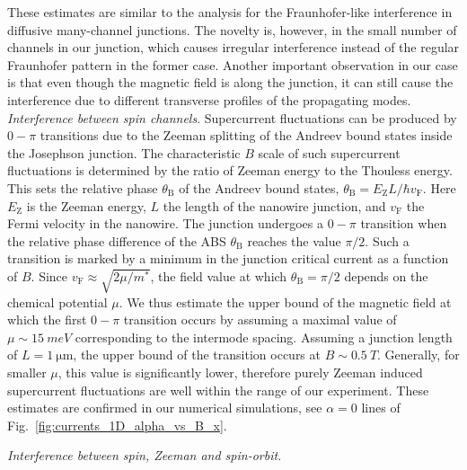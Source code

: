 These estimates are similar to the analysis for the Fraunhofer-like interference in diffusive many-channel junctions\cite{Cuevas2007}.
The novelty is, however, in the small number of channels in our junction, which causes irregular interference instead of the regular Fraunhofer pattern in the former case.
Another important observation in our case is that even though the magnetic field is along the junction, it can still cause the interference due to different transverse profiles of the propagating modes.\\

\textit{Interference between spin channels}.
Supercurrent fluctuations can be produced by $0-\pi$ transitions due to the Zeeman splitting of the Andreev bound states inside the Josephson junction.
The characteristic $B$ scale of such supercurrent fluctuations is determined by the ratio of Zeeman energy to the Thouless energy.
This sets the relative phase $\theta_\mathrm{B}$ of the Andreev bound states, $\theta_\mathrm{B} = E_\mathrm{Z} L / \hbar v_\mathrm{F}$.
Here $E_\mathrm{Z}$ is the Zeeman energy, $L$ the length of the nanowire junction, and $v_\mathrm{F}$ the Fermi velocity in the nanowire.
The junction undergoes a $0-\pi$ transition when the relative phase difference of the ABS $\theta_\mathrm{B}$ reaches the value $\pi/2$.
Such a transition is marked by a minimum in the junction critical current as a function of $B$.
Since $v_\mathrm{F}\approx \sqrt{2\mu / m^*}$, the field value at which $\theta_\mathrm{B}=\pi/2$ depends on the chemical potential $\mu$.
We thus estimate the upper bound of the magnetic field at which the first $0-\pi$ transition occurs by assuming a maximal value of $\mu \sim \SI{15}{meV}$ corresponding to the intermode spacing\cite{Weperen2015,Kammhuber2016}.
Assuming a junction length of $L=\SI{1}{\micro\meter}$, the upper bound of the transition occurs at $B\sim \SI{0.5}{T}$.
Generally, for smaller $\mu$, this value is significantly lower, therefore purely Zeeman induced supercurrent fluctuations are well within the range of our experiment.
These estimates are confirmed in our numerical simulations, see $\alpha=0$ lines of Fig.~\ref{fig:currents_1D_alpha_vs_B_x}.

\textit{Interference between spin, Zeeman and spin-orbit}.

